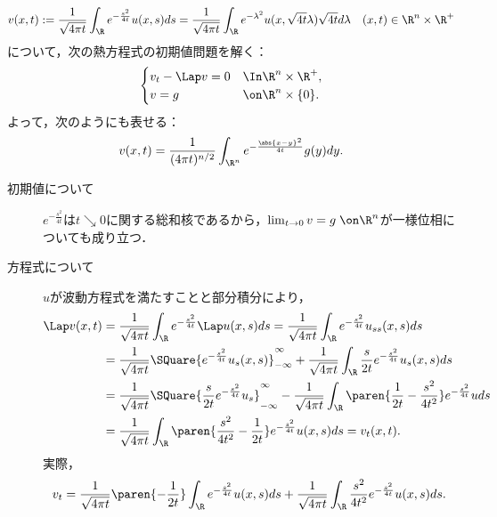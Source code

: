 \documentclass[uplatex,dvipdfmx]{jsreport}
\begin{document}
\begin{proposition}[波動方程式の解のLaplace変換は熱方程式を解く]
    \[v(x,t):=\frac{1}{\sqrt{4\pi t}}\int_{\R}e^{-\frac{s^2}{4t}}u(x,s)ds=\frac{1}{\sqrt{4\pi t}}\int_\R e^{-\lambda^2}u(x,\sqrt{4t}\lambda)\sqrt{4t}d\lambda\quad(x,t)\in\R^n\times\R^+\]
    について，次の熱方程式の初期値問題を解く：
    \[\begin{cases}
        v_t-\Lap v=0&\In\R^n\times\R^+,\\
        v=g&\on\R^n\times\{0\}.
    \end{cases}\]
    よって，次のようにも表せる：
    \[v(x,t)=\frac{1}{(4\pi t)^{n/2}}\int_{\R^n}e^{-\frac{\abs{x-y}^2}{4t}}g(y)dy.\]
\end{proposition}
\begin{Proof}\mbox{}
    \begin{description}
        \item[初期値について] $e^{-\frac{s^2}{4t}}$は$t\searrow0$に関する総和核であるから，$\lim_{t\to0}v=g\;\on\R^n$が一様位相についても成り立つ．
        \item[方程式について] $u$が波動方程式を満たすことと部分積分により，
        \begin{align*}
            \Lap v(x,t)&=\frac{1}{\sqrt{4\pi t}}\int_\R e^{-\frac{s^2}{4t}}\Lap u(x,s)ds=\frac{1}{\sqrt{4\pi t}}\int_\R e^{-\frac{s^2}{4t}}u_{ss}(x,s)ds\\
            &=\frac{1}{\sqrt{4\pi t}}\SQuare{e^{-\frac{s^2}{4t}}u_s(x,s)}^\infty_{-\infty}+\frac{1}{\sqrt{4\pi t}}\int_\R \frac{s}{2t}e^{-\frac{s^2}{4t}}u_s(x,s)ds\\
            &=\frac{1}{\sqrt{4\pi t}}\SQuare{\frac{s}{2t}e^{-\frac{s^2}{4t}}u_s}^\infty_{-\infty}-\frac{1}{\sqrt{4\pi t}}\int_\R\paren{\frac{1}{2t}-\frac{s^2}{4t^2}}e^{-\frac{s^2}{4t}}uds\\
            &=\frac{1}{\sqrt{4\pi t}}\int_\R \paren{\frac{s^2}{4t^2}-\frac{1}{2t}}e^{-\frac{s^2}{4t}}u(x,s)ds=v_t(x,t).
        \end{align*}
        実際，
        \[v_t=\frac{1}{\sqrt{4\pi t}}\paren{-\frac{1}{2t}}\int_\R e^{-\frac{s^2}{4t}}u(x,s)ds+\frac{1}{\sqrt{4\pi t}}\int_\R\frac{s^2}{4t^2}e^{-\frac{s^2}{4t}}u(x,s)ds.\]
    \end{description}
\end{Proof}
\end{document}
